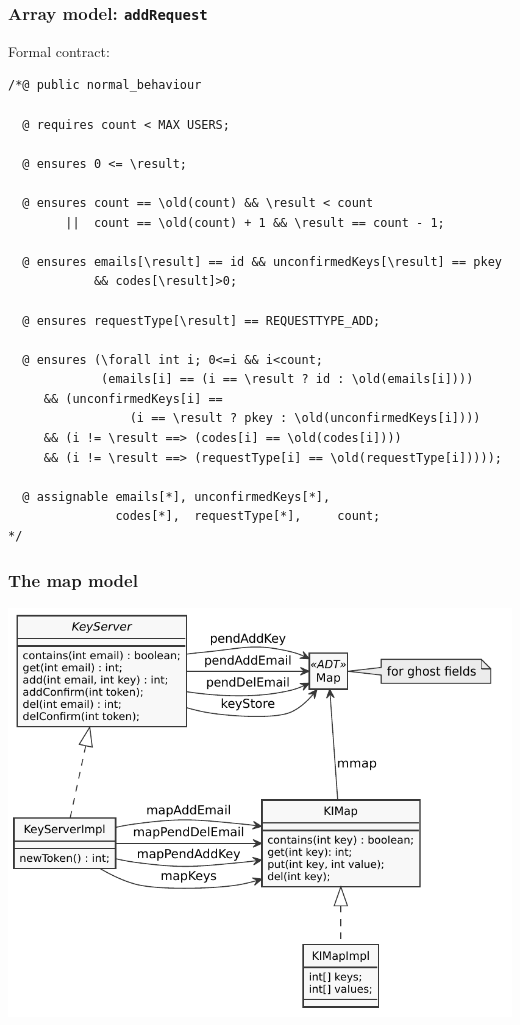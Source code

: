 \documentclass{beamer}
\begin{document}
\begin{frame}[fragile]
    \frametitle{Array model: \texttt{addRequest}}
    \vspace{-1em}
    \begin{exampleblock}{Formal contract:}
    \vspace{-.5em}
\begin{lstlisting}
/*@ public normal_behaviour

  @ requires count < MAX USERS;
  
  @ ensures 0 <= \result;

  @ ensures count == \old(count) && \result < count
        ||  count == \old(count) + 1 && \result == count - 1;

  @ ensures emails[\result] == id && unconfirmedKeys[\result] == pkey
            && codes[\result]>0;

  @ ensures requestType[\result] == REQUESTTYPE_ADD;

  @ ensures (\forall int i; 0<=i && i<count;
             (emails[i] == (i == \result ? id : \old(emails[i])))
     && (unconfirmedKeys[i] ==
                 (i == \result ? pkey : \old(unconfirmedKeys[i])))
     && (i != \result ==> (codes[i] == \old(codes[i])))
     && (i != \result ==> (requestType[i] == \old(requestType[i]))));

  @ assignable emails[*], unconfirmedKeys[*],
               codes[*],  requestType[*],     count;
*/
\end{lstlisting}
\end{exampleblock}
\end{frame}



\lstset {
  basicstyle=\footnotesize\ttfamily,
}

\begin{frame}
  \frametitle{The map model}
  \centering  \includegraphics[height=.9\textheight]{imap}
\end{frame}
\end{document}

